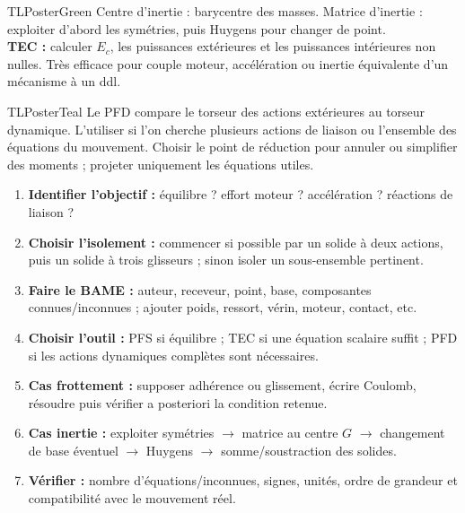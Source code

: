 \documentclass[10pt,a3paper]{article}
\begin{document}
\begin{minipage}[t]{0.49\linewidth}
\begin{TLPosterBloc}{TLPosterGreen}
Centre d'inertie : barycentre des masses. Matrice d'inertie : exploiter d'abord les symétries, puis Huygens pour changer de point.\\
\textbf{TEC :} calculer $E_c$, les puissances extérieures et les puissances intérieures non nulles. Très efficace pour couple moteur, accélération ou inertie équivalente d'un mécanisme à un ddl.
\end{TLPosterBloc}
\begin{TLPosterBloc}{TLPosterTeal}
Le PFD compare le torseur des actions extérieures au torseur dynamique. L'utiliser si l'on cherche plusieurs actions de liaison ou l'ensemble des équations du mouvement. Choisir le point de réduction pour annuler ou simplifier des moments ; projeter uniquement les équations utiles.
\end{TLPosterBloc}
\end{minipage}
\vfill
\begin{TLPosterMethode}
\begin{enumerate}
  \item \textbf{Identifier l'objectif :} équilibre ? effort moteur ? accélération ? réactions de liaison ?
  \item \textbf{Choisir l'isolement :} commencer si possible par un solide à deux actions, puis un solide à trois glisseurs ; sinon isoler un sous-ensemble pertinent.
  \item \textbf{Faire le BAME :} auteur, receveur, point, base, composantes connues/inconnues ; ajouter poids, ressort, vérin, moteur, contact, etc.
  \item \textbf{Choisir l'outil :} PFS si équilibre ; TEC si une équation scalaire suffit ; PFD si les actions dynamiques complètes sont nécessaires.
  \item \textbf{Cas frottement :} supposer adhérence ou glissement, écrire Coulomb, résoudre puis vérifier a posteriori la condition retenue.
  \item \textbf{Cas inertie :} exploiter symétries $\rightarrow$ matrice au centre $G$ $\rightarrow$ changement de base éventuel $\rightarrow$ Huygens $\rightarrow$ somme/soustraction des solides.
  \item \textbf{Vérifier :} nombre d'équations/inconnues, signes, unités, ordre de grandeur et compatibilité avec le mouvement réel.
\end{enumerate}
\end{TLPosterMethode}
\vfill
{}
\end{document}
